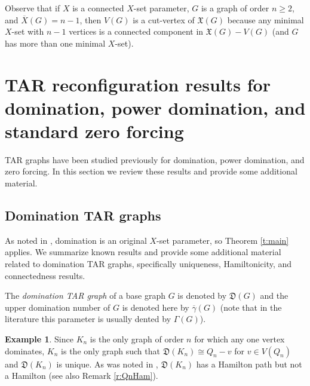 \documentclass{article}
\numberwithin{figure}{section}
\numberwithin{table}{section}
\numberwithin{equation}{section}
\theoremstyle{definition}
\theoremstyle{definition}
\theoremstyle{definition}
\newtheorem{ex}[thm]{Example}
\newcommand{\ol}{\overline}
\newcommand{\dbar}{\ol\gamma}
\newcommand{\xbar}{\ol X}
\newcommand{\xtar}{\mathfrak{X}}%
\newcommand{\dtar}{\mathfrak{D}}%
\begin{document}
{Observe that if $X$ is a connected $X$-set parameter, $G$ is a graph of order $n\ge 2$, and $\xbar(G)=n-1$, then $V(G)$ is a cut-vertex of $\xtar(G)$ because any minimal $X$-set with $n-1$ vertices is a connected component in $\xtar(G)-V(G)$ (and $G$ has more than one minimal $X$-set).


\section{TAR reconfiguration results for domination, power domination, and standard zero forcing }\label{s:Dom-PD-Z}

 TAR graphs have  been studied previously for domination, power domination, and zero forcing.  In this section we review these results and provide some additional material.
 
\subsection{Domination TAR graphs}\label{ss:Dom}
 As noted in \cite{XTARiso}, domination is an original $X$-set parameter, so Theorem \ref{t:main} applies. 
 We summarize known results and provide some additional material related to domination TAR graphs, specifically uniqueness, Hamiltonicity, and connectedness results.

 The \emph{domination TAR graph}  of a  base graph  $G$ is denoted by  $\dtar(G)$ and the upper domination number of $G$ is denoted here by $\dbar(G)$ (note that in the literature this parameter is usually dented by $\Gamma(G)$).



 



\begin{ex}\label{ex:KnDom}
    Since $K_n$ is the only graph of order $n$ for which any one vertex dominates, $K_n$ is the only graph such that $\dtar(K_n)\cong Q_n-v$ for $v\in V(Q_n)$ and $\dtar(K_n)$ is unique.    As was noted in \cite{WIGArecon}, $\dtar(K_n)$ has a Hamilton path but not a Hamilton  (see also Remark \ref{r:QnHam}).
\end{ex}

}
\end{document}

